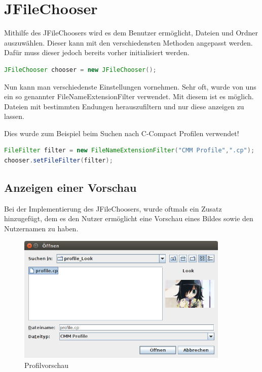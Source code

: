 \section{JFileChooser}
\label{sec:JFileChooser}

Mithilfe des JFileChoosers wird es dem Benutzer ermöglicht, Dateien und Ordner auszuwählen. Dieser kann mit den verschiedensten Methoden angepasst werden. Dafür muss dieser jedoch bereits vorher initialisiert werden.

\begin{lstlisting}[language=JAVA]
JFileChooser chooser = new JFileChooser();
\end{lstlisting}
    
Nun kann man verschiedenste Einstellungen vornehmen. Sehr oft, wurde von uns ein so genannter FileNameExtensionFilter verwendet. Mit diesem ist es möglich. Dateien mit bestimmten Endungen herauszufiltern und nur diese anzeigen zu lassen.

Dies wurde zum Beispiel beim Suchen nach C-Compact Profilen verwendet!
\begin{lstlisting}[language=JAVA]
FileFilter filter = new FileNameExtensionFilter("CMM Profile",".cp");
chooser.setFileFilter(filter);
\end{lstlisting}



\subsection{Anzeigen einer Vorschau}
Bei der Implementierung des JFileChoosers, wurde oftmals ein Zusatz hinzugefügt, dem es den Nutzer ermöglicht eine Vorschau eines Bildes sowie den Nutzernamen zu haben.

\begin{figure}[h] 
  \centering
     \includegraphics[width=0.9\textwidth]{./media/images/gui/launcher/launcher_finden.png}
  \caption{ Profilvorschau}
  \label{fig:Bild1}
\end{figure}

